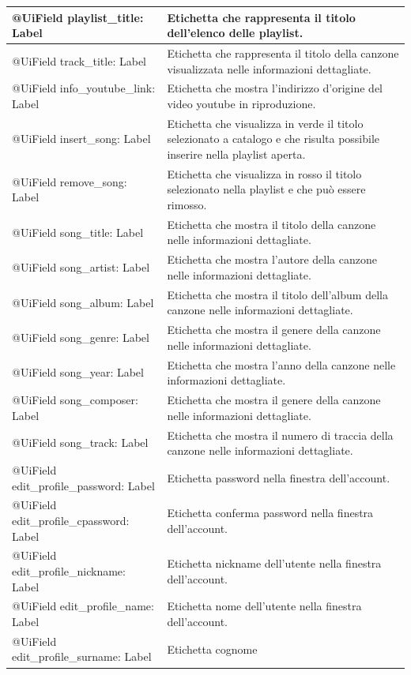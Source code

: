 \begin{longtable}{|p{}|p{}|}
@UiField playlist\_title: Label & Etichetta che rappresenta il titolo
dell'elenco delle playlist.\\\hline
@UiField track\_title: Label & Etichetta che rappresenta il titolo della
canzone visualizzata nelle informazioni dettagliate.\\\hline
@UiField info\_youtube\_link: Label & Etichetta che mostra l'indirizzo
d'origine del video youtube in riproduzione.\\\hline
@UiField insert\_song: Label & Etichetta che visualizza in verde il
titolo selezionato a catalogo e che risulta possibile inserire nella
playlist aperta.\\\hline
@UiField remove\_song: Label & Etichetta che visualizza in rosso il
titolo selezionato nella playlist e che pu\`o essere rimosso.\\\hline
@UiField song\_title: Label & Etichetta che mostra il titolo della
canzone nelle informazioni dettagliate.\\\hline
@UiField song\_artist: Label & Etichetta che mostra l'autore della
canzone nelle informazioni dettagliate.\\\hline
@UiField song\_album: Label & Etichetta che mostra il titolo dell'album
della canzone nelle informazioni dettagliate.\\\hline
@UiField song\_genre: Label & Etichetta che mostra il genere della
canzone nelle informazioni dettagliate.\\\hline
@UiField song\_year: Label & Etichetta che mostra l'anno della canzone
nelle informazioni dettagliate.\\\hline
@UiField song\_composer: Label & Etichetta che mostra il genere della
canzone nelle informazioni dettagliate.\\\hline
@UiField song\_track: Label & Etichetta che mostra il numero di
traccia della canzone nelle informazioni dettagliate.\\\hline
@UiField edit\_profile\_password: Label & Etichetta 
password nella finestra dell'account.\\\hline
@UiField edit\_profile\_cpassword: Label & Etichetta 
conferma password nella finestra dell'account.\\\hline
@UiField edit\_profile\_nickname: Label & Etichetta nickname
dell'utente nella finestra dell'account.\\\hline
@UiField edit\_profile\_name: Label & Etichetta  nome
dell'utente nella finestra dell'account.\\\hline
@UiField edit\_profile\_surname: Label & Etichetta cognome

\end{longtable}
